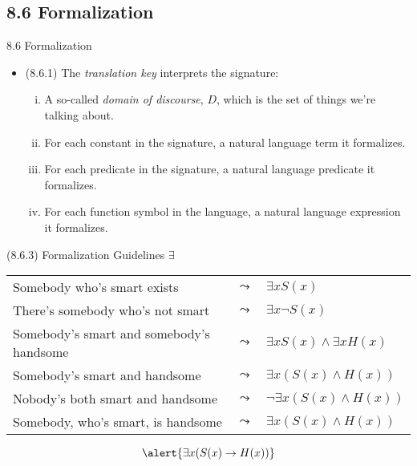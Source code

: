 \subsection{8.6 Formalization}
\begin{frame}{8.6 Formalization}

	\begin{itemize}%
	\itemsep=16pt

	\item (8.6.1) The \emph{translation key} interprets the signature:
	
	\begin{enumerate}[(i)]
		
			\item A so-called \emph{domain of discourse}, $D$, which is the set of things we're talking about.
			
			\item For each constant in the signature, a natural language term it formalizes.
			
			\item For each predicate in the signature, a natural language predicate it formalizes.
			
			\item For each function symbol in the language, a natural language expression it formalizes.
			
		\end{enumerate}


\end{itemize}

\end{frame}

\begin{frame}{(8.6.3) Formalization Guidelines $\exists$}

\begin{tabular}{p{6.5cm} c l}
		
		Somebody who's smart exists & $\leadsto$ & $\exists x S(x)$\\

		
		There's somebody who's not smart & $\leadsto$ & $\exists x\neg S(x)$\\

Somebody's smart and somebody's handsome & $\leadsto$ & $\exists xS(x)\land \exists xH(x)$\\

Somebody's smart and handsome & $\leadsto$ & $\exists x(S(x)\land H(x))$\\
 Nobody's both smart and handsome & $\leadsto$ &$\neg\exists x(S(x)\land H(x))$\\
 
 Somebody, who's smart, is handsome & $\leadsto$ & $\exists x(S(x)\land H(x))$
		
		\end{tabular}
		
		\vspace{4ex}
		
		 \[\alert{\exists x(S(x)\to H(x))}\]

\end{frame}

